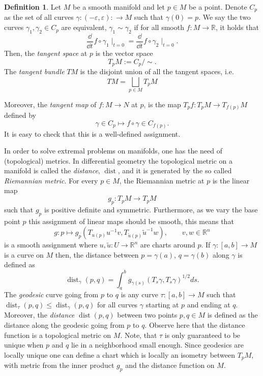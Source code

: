 \documentclass[12pt,a4paper]{article}
\theoremstyle{definition}
\newtheorem{definition}[theorem]{Definition}
\theoremstyle{remark}
\DeclareMathOperator{\dist}{dist}
\newcommand{\ddf}[3]{\frac{\dd^{#1} #2}{\dd #3^{#1}}}
\begin{document}
\begin{definition}
Let $M$ be a smooth manifold and let $p\in M$ be a point. Denote $C_p$ as the set of all curves $\gamma:(-\varepsilon,\varepsilon): \rightarrow M$ such that $\gamma(0)=p$. We say the two curves $\gamma_1, \gamma_2\in C_p$ are equivalent, $\gamma_1 \sim \gamma_2$ if for all smooth $f:M\rightarrow \mathbb{R}$, it holds that
\[
\ddf { }{ }{t} f\circ \gamma_1 \mid_{t=0} = \ddf { }{ }{t} f\circ \gamma_2 \mid_{t=0}.
\]
Then, the \textit{tangent space} at $p$ is the vector space
\[
T_p M := C_p/\sim.
\]
The \textit{tangent bundle} $TM$ is the disjoint union of all the tangent spaces, i.e.
\[
TM = \bigsqcup_{p\in M} T_pM
\]
\end{definition}

Moreover, the \textit{tangent map} of $f:M\rightarrow N$ at $p$, is the map $T_p f:T_pM \rightarrow T_{f(p)}M$ defined by 
\[
\gamma\in C_p \longmapsto f\circ \gamma \in C_{f(p)}.
\]
It is easy to check that this is a well-defined assignment.

In order to solve extremal problems on manifolds, one has the need of (topological) metrics. In differential geometry the topological metric on a manifold is called the \textit{distance}, $\dist$, and it is generated by the so called \textit{Riemannian metric}. For every $p\in M$, the Riemannian metric at $p$ is the linear map
\[
g_p : T_pM \rightarrow T_pM
\]
such that $g_p$ is positive definite and symmetric. Furthermore, as we vary the base point $p$ this assignment of linear maps should be smooth, this means that 
\[
g:p\longmapsto g_p(T_{u(p)}u^{-1} v,T_{\tilde{u}(p)}\tilde{u}^{-1}w), \qquad v,w\in \mathbb{R}^n
\]
is a smooth assignment where $u,\tilde{u}:U\rightarrow \mathbb{R}^n$ are charts around $p$. If $\gamma:[a,b]\rightarrow M$ is a curve on $M$ then, the distance between $p=\gamma(a)$, $q=\gamma(b)$ along $\gamma$ is defined as
\[
\dist_\gamma (p,q)=\int_a^b g_{\gamma(s)}(T_s\gamma,T_s\gamma)^{1/2} ds.
\]
The \textit{geodesic} curve going from $p$ to $q$ is any curve $\tau:[a,b]\rightarrow M$ such that $\dist_\tau(p,q) \leq\dist_\gamma(p,q)$ for all curves $\gamma$ starting at $p$ and ending at $q$. Moreover, the \textit{distance} $\dist(p,q)$ between two points $p,q\in M$ is defined as the distance along the geodesic going from $p$ to $q$. Observe here that the distance function is a topological metric on $M$. Note, that $\tau$ is only guaranteed to be unique when $p$ and $q$ lie in a neighborhood small enough. Since geodesics are locally unique one can define a chart which is locally an isometry between $T_p M$, with metric from the inner product $g_p$ and the distance function on $M$.
\end{document}
